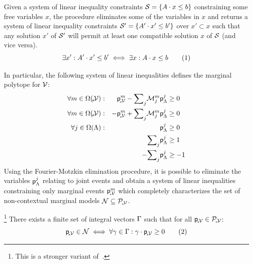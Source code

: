 \documentclass[aps, 10pt, english, twoside, twocolumn, pra, nofootinbib, tightenlines, longbibliography, superscriptaddress]{revtex4-1}
\begin{document}
    \begin{definition} \cite[Section 12.2]{Schrijver_1998}
        Given a system of linear inequality constraints $\s S = \bc{A \cdot x \leq b}$ constraining some free variables $x$, the  procedure eliminates some of the variables in $x$ and returns a system of linear inequality constraints $\s S' = \bc{A' \cdot x' \leq b'}$ over $x' \subset x$ such that any solution $x'$ of $\mathcal{S}'$ will permit at least one compatible solution $x$ of $\mathcal{S}$ (and vice versa).
        \[ \exists x' : A' \cdot x' \leq b' \iff \exists x : A \cdot x \leq b \eq \label{eq:fourier_motzkin_gaurantee} \]
    \end{definition}

    In particular, the following system of linear inequalities defines the marginal polytope for $\mathcal{V}$:
    \begin{equation}
    \label{eq:halfspace_representation}
    \begin{alignedat}{2}
        \forall m \in \events{\mscenariowrap} :&&\quad \prob{\mscenariowrap}^m - {\sum}_{j} \incidence^m_j \prob{\jointvar}^j &\geq 0 \\
        \forall m \in \events{\mscenariowrap} :&&\quad -\prob{\mscenariowrap}^m + {\sum}_{j} \incidence^m_j \prob{\jointvar}^j &\geq 0 \\
        \forall j \in \events{\jointvar} :&&\quad \prob{\jointvar}^j &\geq 0 \\
        &&\quad {\sum}_{j}\prob{\jointvar}^j &\geq 1 \\
        &&\quad -{\sum}_{j}\prob{\jointvar}^j &\geq -1
    \end{alignedat}
    \end{equation}
    Using the Fourier-Motzkin elimination procedure, it is possible to eliminate the variables ${\mathsf{p}}_{\Lambda}^{j}$ relating to joint events and obtain a system of linear inequalities constraining only marginal events ${\mathsf{p}}_{\!{}_*\!\mathcal{V}}^{m}$ which completely characterizes the set of non-contextual marginal models $\mathcal{N} \subseteq \mathcal{P}_{\!{}_*\!\mathcal{V}}$.

    \begin{lemma}\footnote{This is a stronger variant of~\cite[Proposition 7]{Abramsky_2012}.}
        \label{lem:homogeneitity}
        There exists a finite set of integral vectors $\Gamma$ such that for all ${\mathsf{p}}_{\!{}_*\!\mathcal{V}} \in \mathcal{P}_{\!{}_*\!\mathcal{V}}$:
        \[ \prob{\mscenariowrap} \in \noncontextual \iff \forall \ga \in \Ga : \ga \cdot \prob{\mscenariowrap}  \geq 0 \eq \label{eq:homogeneitity_lemma} \]
    \end{lemma}
\end{document}
